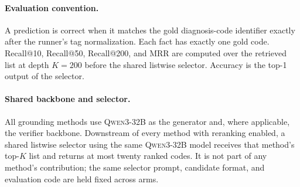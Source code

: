 \paragraph{Evaluation convention.}
A prediction is correct when it matches the gold diagnosis-code identifier
exactly after the runner's tag normalization. Each fact has exactly one gold
code. Recall@10, Recall@50, Recall@200, and MRR are computed over the retrieved
list at depth $K{=}200$ before the shared listwise selector. Accuracy is the
top-1 output of the selector.

\paragraph{Shared backbone and selector.}
All grounding methods use \textsc{Qwen3-32B} as the generator and, where
applicable, the verifier backbone. Downstream of every method with reranking
enabled, a shared listwise selector using the same \textsc{Qwen3-32B} model
receives that method's top-$K$ list and returns at most twenty ranked codes. It
is not part of any method's contribution; the same selector prompt, candidate
format, and evaluation code are held fixed across arms.
